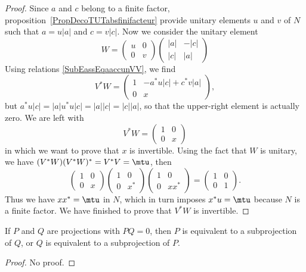 \begin{proof}
	Since $a$ and $c$ belong to a finite factor, proposition~\ref{PropDecoTUTabsfinifacteur} provide unitary elements $u$ and $v$ of $N$ such that $a=u| a |$ and $c=v| c |$. Now we consider the unitary element
	\[
		W=
		\begin{pmatrix}
			u & 0 \\
			0 & v
		\end{pmatrix}
		\begin{pmatrix}
			| a | & -| c | \\
			| c | & | a |
		\end{pmatrix}
	\]
	Using relations \eqref{SubEassEqaaccunVV}, we find
	\[
		V^*W=
		\begin{pmatrix}
			1 & -a^*u| c |+c^*v| a | \\
			0 & x
		\end{pmatrix},
	\]
	but $a^*u| c |=| a |u^*u| c |=| a | | c |=| c | |a |$, so that the upper-right element is actually zero. We are left with
	\[
		V^*W=
		\begin{pmatrix}
			1 & 0 \\
			0 & x
		\end{pmatrix}
	\]
	in which we want to prove that $x$ is invertible. Using the fact that $W$ is unitary, we have $(V^*W)(V^*W)^*=V^*V=\mtu$, then
	\[
		\begin{pmatrix}
			1 & 0 \\
			0 & x
		\end{pmatrix}
		\begin{pmatrix}
			1 & 0   \\
			0 & x^*
		\end{pmatrix}
		\begin{pmatrix}
			1 & 0    \\
			0 & xx^*
		\end{pmatrix}
		=
		\begin{pmatrix}
			1 & 0 \\
			0 & 1
		\end{pmatrix}.
	\]
	Thus we have $xx^*=\mtu$ in $N$, which in turn imposes $x^*u=\mtu$ because $N$ is a finite factor. We have finished to prove that $V^*W$ is invertible.
\end{proof}

\begin{lemma}
	If $P$ and $Q$ are projections with $PQ=0$, then $P$ is equivalent to a subprojection of $Q$, or $Q$ is equivalent to a subprojection of $P$.
\end{lemma}
\begin{proof}
	No proof.
\end{proof}

